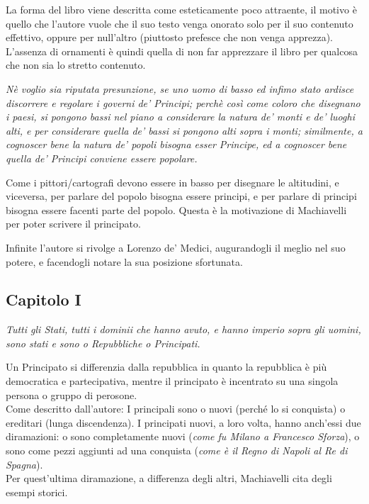 \documentclass[a4paper]{article}
\begin{document}
La forma del libro viene descritta come esteticamente poco attraente,
il motivo è quello che l'autore vuole che il suo testo venga onorato
solo per il suo contenuto effettivo, oppure per null'altro (piuttosto prefesce che non venga apprezza).
L'assenza di ornamenti è quindi quella di non far apprezzare il libro per qualcosa che non sia lo stretto contenuto.

\begin{center}
    \textit{
        Nè voglio sia riputata presunzione, se uno uomo di basso ed infimo stato ardisce discorrere e regolare i governi de' Principi; perchè così come coloro che disegnano i paesi, si pongono bassi nel piano a considerare la natura de' monti e de' luoghi alti, e per considerare quella de' bassi si pongono alti sopra i monti; similmente, a cognoscer bene la natura de' popoli bisogna esser Principe, ed a cognoscer bene quella de' Principi conviene essere popolare.
    }
\end{center}

Come i pittori/cartografi devono essere in basso per disegnare le altitudini, e viceversa, per parlare
del popolo bisogna essere principi, e per parlare di principi bisogna essere facenti parte del popolo.
Questa è la motivazione di Machiavelli per poter scrivere il principato.

Infinite l'autore si rivolge a Lorenzo de' Medici, augurandogli il meglio nel suo potere, e facendogli
notare la sua posizione sfortunata.

\subsection{Capitolo I}

\begin{center}
    \textit{
        Tutti gli Stati, tutti i dominii che hanno avuto, e hanno imperio sopra gli uomini, sono stati e sono o Repubbliche o Principati.
    }
\end{center}

Un Principato si differenzia dalla repubblica in quanto la repubblica è più democratica e partecipativa,
mentre il principato è incentrato su una singola persona o gruppo di perosone. \\
Come descritto dall'autore: I principali sono o nuovi (perché lo si conquista) o ereditari (lunga discendenza).
I principati nuovi, a loro volta, hanno anch'essi due diramazioni:
o sono completamente nuovi (\textit{come fu Milano a Francesco Sforza}),
o sono come pezzi aggiunti ad una conquista
(\textit{come è il Regno di Napoli al Re di Spagna}). \\
Per quest'ultima diramazione, a differenza degli altri, Machiavelli cita degli esempi storici.
\end{document}
